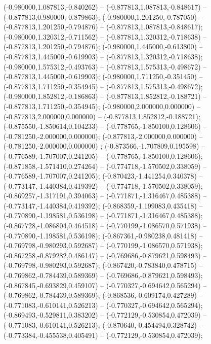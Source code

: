  (-0.980000,1.087813,-0.840262) -- (-0.877813,1.087813,-0.848617) -- (-0.877813,0.980000,-0.879863);
 (-0.980000,1.201250,-0.787050) -- (-0.877813,1.201250,-0.794876) -- (-0.877813,1.087813,-0.848617);
 (-0.980000,1.320312,-0.711562) -- (-0.877813,1.320312,-0.718638) -- (-0.877813,1.201250,-0.794876);
 (-0.980000,1.445000,-0.613800) -- (-0.877813,1.445000,-0.619903) -- (-0.877813,1.320312,-0.718638);
 (-0.980000,1.575312,-0.493763) -- (-0.877813,1.575313,-0.498672) -- (-0.877813,1.445000,-0.619903);
 (-0.980000,1.711250,-0.351450) -- (-0.877813,1.711250,-0.354945) -- (-0.877813,1.575313,-0.498672);
 (-0.980000,1.852812,-0.186863) -- (-0.877813,1.852812,-0.188721) -- (-0.877813,1.711250,-0.354945);
 (-0.980000,2.000000,0.000000) -- (-0.877813,2.000000,0.000000) -- (-0.877813,1.852812,-0.188721);
 (-0.875550,-1.850614,0.104233) -- (-0.778765,-1.850100,0.128606) -- (-0.781250,-2.000000,0.000000);
 (-0.877813,-2.000000,0.000000) -- (-0.781250,-2.000000,0.000000) ;
 (-0.873566,-1.707809,0.195598) -- (-0.776589,-1.707007,0.241205) -- (-0.778765,-1.850100,0.128606);
 (-0.871858,-1.571410,0.274264) -- (-0.774718,-1.570502,0.338059) -- (-0.776589,-1.707007,0.241205);
 (-0.870423,-1.441254,0.340378) -- (-0.773147,-1.440384,0.419392) -- (-0.774718,-1.570502,0.338059);
 (-0.869257,-1.317191,0.394063) -- (-0.771871,-1.316467,0.485388) -- (-0.773147,-1.440384,0.419392);
 (-0.868359,-1.199083,0.435418) -- (-0.770890,-1.198581,0.536198) -- (-0.771871,-1.316467,0.485388);
 (-0.867728,-1.086804,0.464518) -- (-0.770199,-1.086570,0.571938) -- (-0.770890,-1.198581,0.536198);
 (-0.867361,-0.980238,0.481418) -- (-0.769798,-0.980293,0.592687) -- (-0.770199,-1.086570,0.571938);
 (-0.867258,-0.879282,0.486147) -- (-0.769686,-0.879621,0.598493) -- (-0.769798,-0.980293,0.592687);
 (-0.867420,-0.783840,0.478715) -- (-0.769862,-0.784439,0.589369) -- (-0.769686,-0.879621,0.598493);
 (-0.867845,-0.693829,0.459107) -- (-0.770327,-0.694642,0.565294) -- (-0.769862,-0.784439,0.589369);
 (-0.868536,-0.609174,0.427289) -- (-0.771083,-0.610141,0.526213) -- (-0.770327,-0.694642,0.565294);
 (-0.869493,-0.529811,0.383202) -- (-0.772129,-0.530854,0.472039) -- (-0.771083,-0.610141,0.526213);
 (-0.870640,-0.454494,0.328742) -- (-0.773384,-0.455538,0.405491) -- (-0.772129,-0.530854,0.472039);
